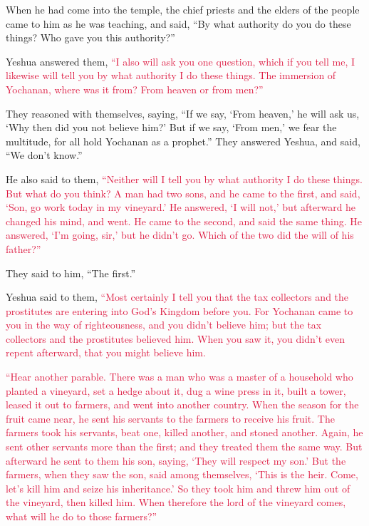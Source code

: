 \myverse{}When he had come into the temple, the chief priests and the
elders of the people came to him as he was teaching, and said, “By what authority do you do these things?
Who gave you this authority?”

\myverse{}Yeshua answered them,
\textcolor{crimson}{“I also will ask you one question, which if you tell me, I likewise will tell you by what authority
	I do these things.
}
\myverse{}\textcolor{crimson}{The immersion of Yochanan, where was it from? From heaven or from men?”
}

They reasoned with themselves, saying, “If we say, ‘From heaven,’ he will ask us, ‘Why then
did you not believe him?’
\myverse{}But if we say, ‘From men,’ we fear the multitude, for all hold Yochanan as
a prophet.”
\myverse{}They answered Yeshua, and said, “We don’t know.”

He also said to them,
\textcolor{crimson}{“Neither will I tell you by what authority I do these things.
}
\myverse{}\textcolor{crimson}{But what do you think? A man had two sons, and he came to the first,
	and said, ‘Son, go work today in my vineyard.’
}
\myverse{}\textcolor{crimson}{He answered, ‘I will not,’ but afterward he changed his mind, and went.
}
\myverse{}\textcolor{crimson}{He came to the second, and said the same thing. He answered, ‘I’m going,
	sir,’ but he didn’t go.
}
\myverse{}\textcolor{crimson}{Which of the two did the will of his father?”}

They said to him, “The first.”

Yeshua said to them,
\textcolor{crimson}{“Most certainly I tell you that the tax collectors and the prostitutes are entering into God’s Kingdom
	before you.
}
\myverse{}\textcolor{crimson}{For Yochanan came to you in the way of righteousness, and you didn’t
	believe him; but the tax collectors and the prostitutes believed him. When you saw it, you didn’t even
	repent afterward, that you might believe him.
}

\myverse{}\textcolor{crimson}{“Hear another parable. There was a man who was a master	of a household who planted a vineyard, set a hedge about it, dug a wine press in it, built a tower, leased it out to farmers, and went into another country.
} \myverse{}\textcolor{crimson}{When the season for the fruit came near, he sent his servants to the farmers to receive his fruit.
}
\myverse{}\textcolor{crimson}{The farmers took his servants, beat one, killed another, and stoned another.
}
\myverse{}\textcolor{crimson}{Again, he sent other servants more than the first; and they treated them
	the same way.
}
\myverse{}\textcolor{crimson}{But afterward he sent to them his son, saying, ‘They will respect my
	son.’
}
\myverse{}\textcolor{crimson}{But the farmers, when they saw the son, said among themselves, ‘This
	is the heir. Come, let’s kill him and seize his inheritance.’
}
\myverse{}\textcolor{crimson}{So they took him and threw him out of the vineyard, then killed him.
}
\myverse{}\textcolor{crimson}{When therefore the lord of the vineyard comes, what will he do to those
	farmers?”}

